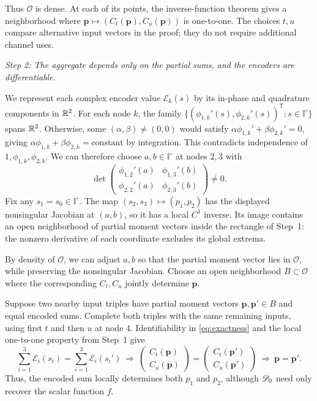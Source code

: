 \documentclass[journal,12pt,onecolumn,draftclsnofoot]{IEEEtran}
\newcommand{\T}{\mathsf T}\newcommand{\suc}{\succeq}
\begin{document}
Thus $\mathcal O$ is dense. At each of its points, the inverse-function
theorem gives a neighborhood where
$\boldsymbol p\mapsto(C_t(\boldsymbol p),C_u(\boldsymbol p))$ is one-to-one.
The choices $t,u$ compare alternative input vectors in the proof;
they do not require additional channel uses.




\emph{Step 2: The aggregate depends only on the partial sums, and the encoders are differentiable.}

We represent each complex encoder value $\mathscr E_k(s)$ by its
in-phase and quadrature components in $\mathbb R^2$. For each node $k$, the family $\{ (\phi_{1,k}'(s),\phi_{2,k}'(s))^\T:
s\in\mathbb I^\circ \}$ spans $\mathbb R^2$.
Otherwise, some $(\alpha,\beta)\ne(0,0)$ would satisfy
$\alpha\phi_{1,k}'+\beta\phi_{2,k}'=0$, giving
$\alpha\phi_{1,k}+\beta\phi_{2,k}=\text{constant}$ by integration.
This contradicts independence of $1,\phi_{1,k},\phi_{2,k}$.
We can therefore choose $a,b\in\mathbb I^\circ$ at nodes $2,3$ with
$$
 \det\begin{pmatrix}\phi_{1,2}'(a)&\phi_{1,3}'(b)\\
                         \phi_{2,2}'(a)&\phi_{2,3}'(b)\end{pmatrix}\ne0.
$$
Fix any $s_1=s_0\in\mathbb I^\circ$.
The map $(s_2,s_3)\mapsto(p_1,p_2)$ has the displayed nonsingular
Jacobian at $(a,b)$, so it has a local $C^1$ inverse.
Its image contains an open neighborhood of partial moment vectors
inside the rectangle of Step~1: the nonzero derivative of each
coordinate excludes its global extrema.

By density of $\mathcal O$, we can adjust $a,b$ so that the partial moment vector lies in $\mathcal O$, while preserving the nonsingular Jacobian. Choose an open neighborhood $B\subset\mathcal O$ where the corresponding $C_t,C_u$ jointly determine $\boldsymbol p$.


Suppose two nearby input triples have partial moment vectors
$\boldsymbol p,\boldsymbol p'\in B$ and equal encoded sums.
Complete both triples with the same remaining inputs, using first
$t$ and then $u$ at node $4$. Identifiability in \eqref{eq:exactness}
and the local one-to-one property from Step~1 give
$$
\sum_{i=1}^3\mathscr E_i(s_i)=\sum_{i=1}^3\mathscr E_i(s_i')
\ \Longrightarrow\ 
\begin{pmatrix}C_t(\boldsymbol p)\\C_u(\boldsymbol p)\end{pmatrix}
=\begin{pmatrix}C_t(\boldsymbol p')\\C_u(\boldsymbol p')\end{pmatrix}
\ \Longrightarrow\ \boldsymbol p=\boldsymbol p'.
$$
Thus, the encoded sum locally determines both $p_1$ and $p_2$, although
$\mathscr{D}_0$ need only recover the scalar function $f$.
\end{document}

